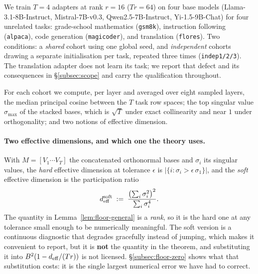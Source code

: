 We train $T = 4$ adapters at rank $r = 16$ ($Tr = 64$) on four base models
(Llama-3.1-8B-Instruct, Mistral-7B-v0.3, Qwen2.5-7B-Instruct,
Yi-1.5-9B-Chat) for four unrelated tasks: grade-school mathematics
(\texttt{gsm8k}), instruction following (\texttt{alpaca}), code generation
(\texttt{magicoder}), and translation (\texttt{flores}). Two conditions: a
\emph{shared} cohort using one global seed, and \emph{independent} cohorts
drawing a separate initialisation per task, repeated three times
(\texttt{indep1/2/3}). The translation adapter does not learn its task; we
report that defect and its consequences in \S\ref{subsec:scope} and carry
the qualification throughout.

For each cohort we compute, per layer and averaged over eight sampled layers,
the median principal cosine between the $T$ task row spaces; the top singular
value $\sigma_{\max}$ of the stacked bases, which is $\sqrt{T}$ under exact
collinearity and near $1$ under orthogonality; and two notions of effective
dimension.

\paragraph{Two effective dimensions, and which one the theory uses.} With
$M = [V_1 \cdots V_T]$ the concatenated orthonormal bases and $\sigma_i$ its
singular values, the \emph{hard} effective dimension at tolerance $\epsilon$
is $|\{i : \sigma_i > \epsilon\,\sigma_1\}|$, and the \emph{soft} effective
dimension is the participation ratio
\begin{equation}\label{eq:soft-deff}
  d_{\mathrm{eff}}^{\mathrm{soft}} \;:=\; \frac{\bigl(\sum_i \sigma_i^2\bigr)^2}
  {\sum_i \sigma_i^4}.
\end{equation}
The quantity in Lemma~\ref{lem:floor-general} is a \emph{rank}, so it is the
hard one at any tolerance small enough to be numerically meaningful. The soft
version is a continuous diagnostic that degrades gracefully instead of
jumping, which makes it convenient to report, but it is \textbf{not} the
quantity in the theorem, and substituting it into $B^2(1-d_{\mathrm{eff}}/(Tr))$ is
not licensed. \S\ref{subsec:floor-zero} shows what that substitution
costs: it is the single largest numerical error we have had to correct.

